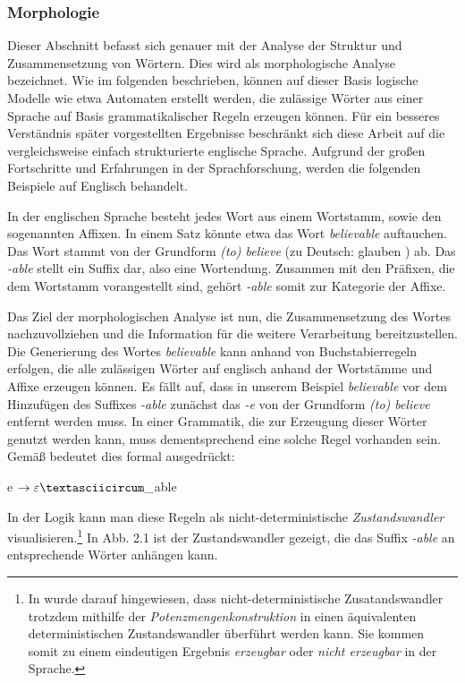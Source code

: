 \documentclass[12pt]{report}
\begin{document}
\subsubsection{Morphologie}
Dieser Abschnitt befasst sich genauer mit der Analyse der Struktur und Zusammensetzung von Wörtern. Dies wird als morphologische Analyse bezeichnet. Wie im folgenden beschrieben, können auf dieser Basis logische Modelle wie etwa Automaten erstellt werden, die zulässige Wörter aus einer Sprache auf Basis grammatikalischer Regeln erzeugen können. Für ein besseres Verständnis später vorgestellten Ergebnisse beschränkt sich diese Arbeit auf die vergleichsweise einfach strukturierte englische Sprache. Aufgrund der großen Fortschritte und Erfahrungen in der Sprachforschung, werden die folgenden Beispiele auf Englisch behandelt.

In der englischen Sprache besteht jedes Wort aus einem Wortstamm, sowie den sogenannten Affixen. In einem Satz könnte etwa das Wort \glqq \textit{believable}\grqq{} auftauchen. Das Wort stammt von der Grundform \glqq \textit{(to) believe}\grqq{} (zu Deutsch: \glqq glauben \grqq{}) ab. Das \textit{-able} stellt ein Suffix dar, also eine Wortendung. Zusammen mit den Präfixen, die dem Wortstamm vorangestellt sind, gehört \textit{-able} somit zur Kategorie der Affixe. 

Das Ziel der morphologischen Analyse ist nun, die Zusammensetzung des Wortes nachzuvollziehen und die Information für die weitere Verarbeitung bereitzustellen. Die Generierung des Wortes \textit{believable} kann anhand von Buchstabierregeln erfolgen, die alle zulässigen Wörter auf englisch anhand der Wortstämme und Affixe erzeugen können. Es fällt auf, dass in unserem Beispiel \textit{believable} vor dem Hinzufügen des Suffixes \textit{-able} zunächst das \textit{-e} von der Grundform \textit{(to) believe} entfernt werden muss. In einer Grammatik, die zur Erzeugung dieser Wörter genutzt werden kann, muss dementsprechend eine solche Regel vorhanden sein. Gemäß \cite{rs18} bedeutet dies formal ausgedrückt:
\tt
\begin{center}
e $\rightarrow \varepsilon \textasciicircum \_$able
\end{center}
\rm

In der Logik kann man diese Regeln als nicht-deterministische \textit{Zustandswandler} visualisieren.\footnote{In \cite{rs18} wurde darauf hingewiesen, dass nicht-deterministische Zusatandswandler trotzdem mithilfe der \textit{Potenzmengenkonstruktion} in einen äquivalenten deterministischen Zustandswandler überführt werden kann. Sie kommen somit zu einem eindeutigen Ergebnis \textit{erzeugbar} oder \textit{nicht erzeugbar} in der Sprache.} In Abb. 2.1 ist der Zustandswandler gezeigt, die das Suffix \textit{-able} an entsprechende Wörter anhängen kann.
\\
\end{document}
